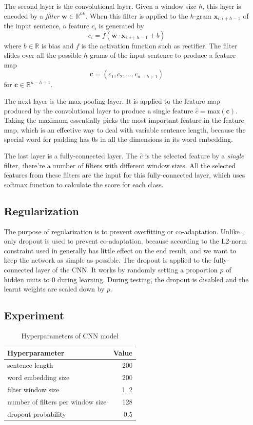 The second layer is the convolutional layer. Given a window size $h$, this layer is encoded by a {\em filter} $\textbf{w} \in \mathbb{R}^{hk}$. When this filter is applied to the $h$-gram $\textbf{x}_{i:i+h-1}$ of the input sentence, a feature $c_i$ is generated by
$$
c_i = f(\textbf{w} \cdot \textbf{x}_{i:i+h-1} + b)
$$
where $b \in \mathbb{R}$ is bias and $f$ is the activation function such as rectifier. The filter slides over all the possible $h$-grams of the input sentence to produce a feature map
$$
\textbf{c} = (c_1, c_2, \ldots, c_{n-h+1})
$$ 
for $\textbf{c} \in \mathbb{R}^{n-h+1}$.

The next layer is the max-pooling layer. It is applied to the feature map produced by the convolutional layer to produce a single feature $\hat{c} = \text{max}(\textbf{c})$. Taking the maximum essentially picks the most important feature in the feature map, which is an effective way to deal with variable sentence length, because the special word for padding has 0s in all the dimensions in its word embedding. 

The last layer is a fully-connected layer. The $\hat{c}$ is the selected feature by a {\em single} filter, there're a number of filters with different window sizes. All the selected features from these filters are the input for this fully-connected layer, which uses softmax function to calculate the score for each class. 

\subsection{Regularization}

The purpose of regularization is to prevent overfitting or co-adaptation. Unlike \cite{kim2014}, only dropout is used to prevent co-adaptation, because according to \cite{zhang2015} the L2-norm constraint used in \cite{kim2014} generally has little effect on the end result, and we want to keep the network as simple as possible. The dropout is applied to the fully-connected layer of the CNN. It works by randomly setting a proportion $p$ of hidden units to 0 during learning. During testing, the dropout is disabled and the learnt weights are scaled down by $p$.

\subsection{Experiment}

\begin{table}[htb]
\centering
\begin{tabular}{| l | r |}
\hline
{\bf Hyperparameter} & {\bf Value}  \\ \hline
sentence length & 200 \\ \hline
word embedding size & 200 \\ \hline
filter window size & 1, 2 \\ \hline
number of filters per window size & 128 \\ \hline
dropout probability & 0.5 \\
\hline
\end{tabular}
\caption{Hyperparameters of CNN model}\label{tbl.cnn.param}
\end{table}

